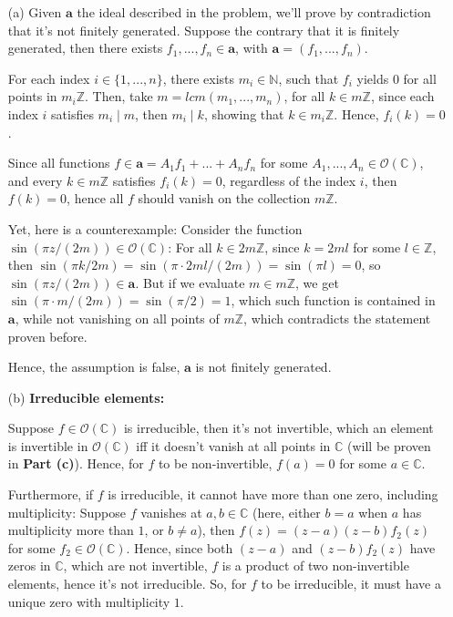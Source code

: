 \documentclass{article}
\begin{document}
\begin{itemize}
    \item[(a)] Given $\textbf{a}$ the ideal described in the problem, we'll prove by contradiction that it's not finitely generated.
    Suppose the contrary that it is finitely generated, then there exists $f_1,...,f_n\in\textbf{a}$, with $\textbf{a}=(f_1,...,f_n)$.

    For each index $i\in\{1,...,n\}$, there exists $m_i\in\mathbb{N}$, such that $f_i$ yields $0$ for all points in $m_i\mathbb{Z}$.
    Then, take $m=lcm(m_1,...,m_n)$, for all $k\in m\mathbb{Z}$, since each index $i$ satisfies $m_i\mid m$, then $m_i\mid k$, showing that $k\in m_i\mathbb{Z}$.
    Hence, $f_i(k)=0$.

    Since all functions $f\in\textbf{a} = A_1f_1+...+A_nf_n$ for some $A_1,...,A_n\in\mathcal{O}(\mathbb{C})$, and every $k\in m\mathbb{Z}$ satisfies $f_i(k)=0$, regardless of the index $i$,
    then $f(k)=0$, hence all $f$ should vanish on the collection $m\mathbb{Z}$.

    Yet, here is a counterexample: Consider the function $\sin(\pi z/(2m))\in\mathcal{O}(\mathbb{C})$: For all $k\in 2m\mathbb{Z}$, since $k=2ml$ for some $l\in\mathbb{Z}$,
    then $\sin(\pi k/2m)=\sin(\pi\cdot 2ml/(2m))=\sin(\pi l)=0$, so $\sin(\pi z/(2m))\in \textbf{a}$.
    But if we evaluate $m\in m\mathbb{Z}$, we get $\sin(\pi\cdot m/(2m))=\sin(\pi/2)=1$, which such function is contained in $\textbf{a}$, while not vanishing on all points of $m\mathbb{Z}$,
    which contradicts the statement proven before. 

    Hence, the assumption is false, $\textbf{a}$ is not finitely generated.

    \hfil

    \item[(b)] \textbf{Irreducible elements:}
    
    Suppose $f\in\mathcal{O}(\mathbb{C})$ is irreducible, then it's not invertible, which an element is invertible in $\mathcal{O}(\mathbb{C})$ iff it doesn't vanish at all points in $\mathbb{C}$ (will be proven in \textbf{Part (c)}).
    Hence, for $f$ to be non-invertible, $f(a)=0$ for some $a\in\mathbb{C}$.

    Furthermore, if $f$ is irreducible, it cannot have more than one zero, including multiplicity: Suppose $f$ vanishes at $a,b\in\mathbb{C}$ (here, either $b=a$ when $a$ has multiplicity more than $1$, or $b\neq a$),
    then $f(z)=(z-a)(z-b)f_2(z)$ for some $f_2\in\mathcal{O}(\mathbb{C})$. Hence, since both $(z-a)$ and $(z-b)f_2(z)$ have zeros in $\mathbb{C}$, which are not invertible, $f$ is a product of two non-invertible elements, hence it's not irreducible.
    So, for $f$ to be irreducible, it must have a unique zero with multiplicity $1$.


\end{itemize}
\end{document}
